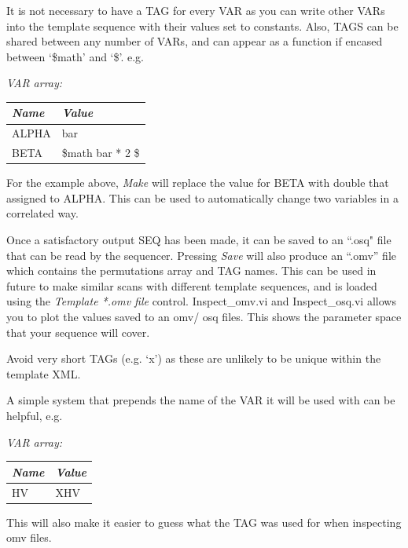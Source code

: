 \documentclass[10pt,a4paper]{article}
\newenvironment{warning}[1]{%
	\tcolorbox[beamer,%
	breakable,
	colback=white,colframe=DarkRed,%
	title=Warning:]}%
{\endtcolorbox}
\begin{document}
It is not necessary to have a TAG for every VAR as you can write other VARs into the template sequence with their values set to constants.  Also, TAGS can be shared between any number of VARs, and can appear as a function if encased between `\$math' and `\$'. e.g.

\hangindent=0.7cm
\emph{VAR array:} \\
\begin{tabularx}{0.5\textwidth}{X|X}
	\emph{Name} & \emph{Value} \\
	\hline	
	ALPHA & bar \\
	BETA & \$math bar * 2 \$
\end{tabularx}
\vspace{2mm}

\noindent For the example above, \emph{Make} will replace the value for BETA with double that assigned to ALPHA.  This can be used to automatically change two variables in a correlated way.

Once a satisfactory output SEQ has been made, it can be saved to an ``.osq" file that can be read by the sequencer.  Pressing \emph{Save} will also produce an ``.omv'' file which contains the permutations array and TAG names.  This can be used in future to make similar scans with different template sequences, and is loaded using the \emph{Template *.omv file} control.  Inspect\_omv.vi and Inspect\_osq.vi allows you to plot the values saved to an omv/ osq files. This shows the parameter space that your sequence will cover.

\begin{warning} {}
	Avoid very short TAGs  (e.g. `x') as these are unlikely to be unique within the template XML.
	
	A simple system that prepends the name of the VAR it will be used with can be helpful, e.g.

	\hangindent=0.7cm
	\emph{VAR array:} \\
	\begin{tabularx}{0.5\textwidth}{X|X}
		\emph{Name} & \emph{Value} \\
		\hline
		HV & XHV \\
	\end{tabularx}
	\vspace{2mm}
	
	This will also make it easier to guess what the TAG was used for when inspecting omv files.
\end{warning}
\end{document}
